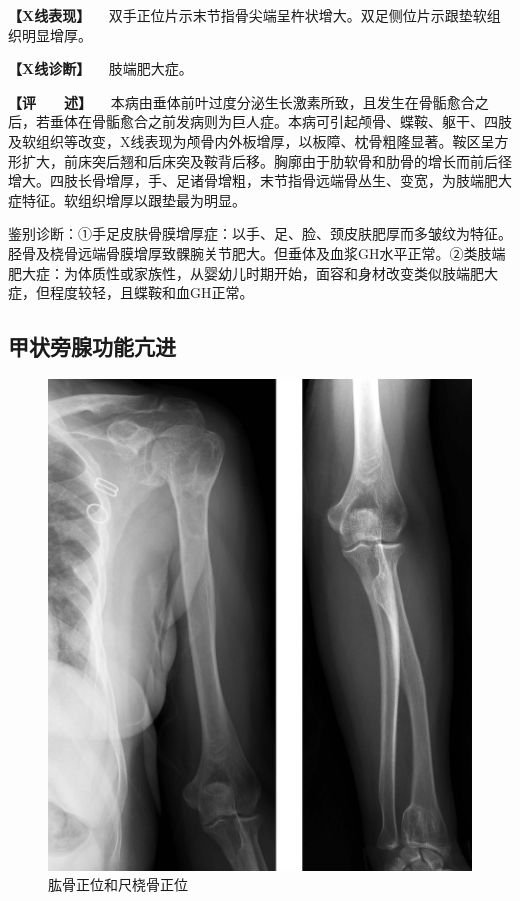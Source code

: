 \textbf{【X线表现】}
　双手正位片示末节指骨尖端呈杵状增大。双足侧位片示跟垫软组织明显增厚。

\textbf{【X线诊断】} 　肢端肥大症。

\textbf{【评　　述】}
　本病由垂体前叶过度分泌生长激素所致，且发生在骨骺愈合之后，若垂体在骨骺愈合之前发病则为巨人症。本病可引起颅骨、蝶鞍、躯干、四肢及软组织等改变，X线表现为颅骨内外板增厚，以板障、枕骨粗隆显著。鞍区呈方形扩大，前床突后翘和后床突及鞍背后移。胸廓由于肋软骨和肋骨的增长而前后径增大。四肢长骨增厚，手、足诸骨增粗，末节指骨远端骨丛生、变宽，为肢端肥大症特征。软组织增厚以跟垫最为明显。

鉴别诊断：①手足皮肤骨膜增厚症：以手、足、脸、颈皮肤肥厚而多皱纹为特征。胫骨及桡骨远端骨膜增厚致髁腕关节肥大。但垂体及血浆GH水平正常。②类肢端肥大症：为体质性或家族性，从婴幼儿时期开始，面容和身材改变类似肢端肥大症，但程度较轻，且蝶鞍和血GH正常。

\subsection{甲状旁腺功能亢进}

\begin{figure}[!htbp]
 \centering
 \includegraphics{./images/Image00126.jpg}
 \captionsetup{justification=centering}
 \caption{肱骨正位和尺桡骨正位}
 \label{fig2-8-12}
  \end{figure} 

